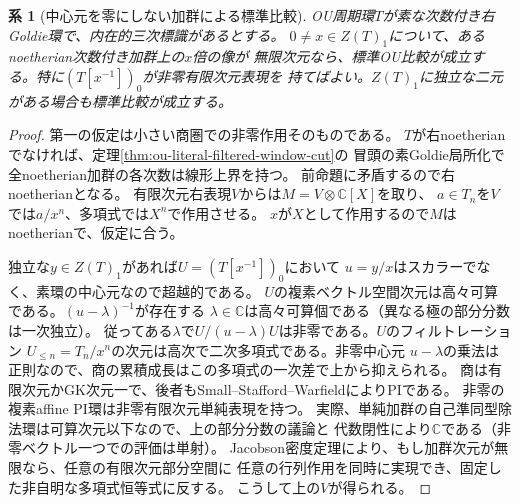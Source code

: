 \documentclass[11pt,a4paper]{ltjsarticle}
\newtheorem{corollary}[theorem]{系}
\theoremstyle{definition}
\begin{document}
\begin{corollary}[中心元を零にしない加群による標準比較]
\label{cor:ou-visible-standard-comparison}
OU周期環$T$が素な次数付き右Goldie環で、内在的三次標識があるとする。
$0\ne x\in Z(T)_1$について、あるnoetherian次数付き加群上の$x$倍の像が
無限次元なら、標準OU比較が成立する。特に$(T[x^{-1}])_0$が非零有限次元表現を
持てばよい。$Z(T)_1$に独立な二元がある場合も標準比較が成立する。
\end{corollary}
\begin{proof}
第一の仮定は小さい商圏での非零作用そのものである。
$T$が右noetherianでなければ、定理\ref{thm:ou-literal-filtered-window-cut}の
冒頭の素Goldie局所化で全noetherian加群の各次数は線形上界を持つ。
前命題に矛盾するので右noetherianとなる。
有限次元右表現$V$からは$M=V\otimes\mathbb C[X]$を取り、
$a\in T_n$を$V$では$a/x^n$、多項式では$X^n$で作用させる。
$x$が$X$として作用するので$M$はnoetherianで、仮定に合う。

独立な$y\in Z(T)_1$があれば$U=(T[x^{-1}])_0$において
$u=y/x$はスカラーでなく、素環の中心元なので超越的である。
$U$の複素ベクトル空間次元は高々可算である。$(u-\lambda)^{-1}$が存在する
$\lambda\in\mathbb C$は高々可算個である（異なる極の部分分数は一次独立）。
従ってある$\lambda$で$U/(u-\lambda)U$は非零である。$U$のフィルトレーション
$U_{\le n}=T_n/x^n$の次元は高次で二次多項式である。非零中心元
$u-\lambda$の乗法は正則なので、商の累積成長はこの多項式の一次差で上から抑えられる。
商は有限次元かGK次元一で、後者もSmall--Stafford--Warfield\cite{SSW1985}によりPIである。
非零の複素affine PI環は非零有限次元単純表現を持つ。
実際、単純加群の自己準同型除法環は可算次元以下なので、上の部分分数の議論と
代数閉性により$\mathbb C$である（非零ベクトル一つでの評価は単射）。
Jacobson密度定理により、もし加群次元が無限なら、任意の有限次元部分空間に
任意の行列作用を同時に実現でき、固定した非自明な多項式恒等式に反する。
こうして上の$V$が得られる。
\end{proof}
\end{document}
